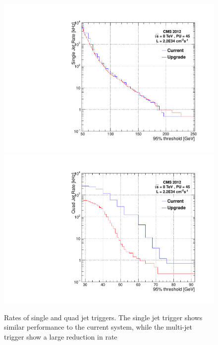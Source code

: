 \begin{figure}[t!]
\begin{center}
  \includegraphics[scale=0.3]{Figures/l1jets/singleJetRates_95thresh_2e34.pdf}
    \includegraphics[scale=0.3]{Figures/l1jets/quadJetRates_95thresh_2e34.pdf}
\caption{Rates of single and quad jet triggers. The single jet trigger shows similar performance to the current system, while the multi-jet trigger show a large reduction in rate}
\label{JetRate}
\end{center}
\end{figure}
